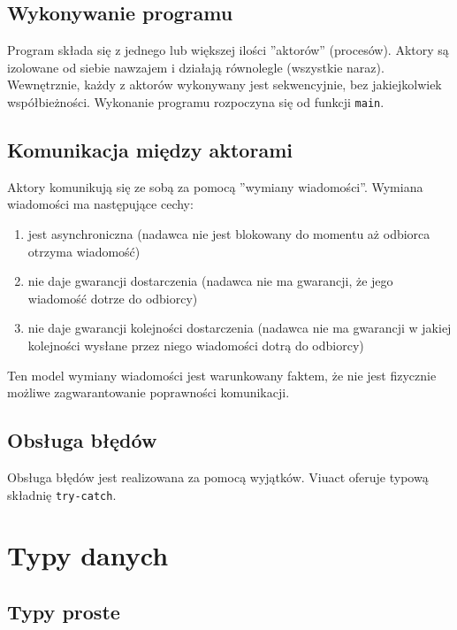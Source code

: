 \subsection{Wykonywanie programu}

Program składa się z jednego lub większej ilości ''aktorów'' (procesów).
Aktory są izolowane od siebie nawzajem i działają równolegle (wszystkie naraz).
Wewnętrznie, każdy z aktorów wykonywany jest sekwencyjnie, bez jakiejkolwiek
współbieżności.
Wykonanie programu rozpoczyna się od funkcji \texttt{main}.

\subsection{Komunikacja między aktorami}

Aktory komunikują się ze sobą za pomocą ''wymiany wiadomości''.
Wymiana wiadomości ma następujące cechy:

\begin{enumerate}
    \item jest asynchroniczna (nadawca nie jest blokowany do momentu aż odbiorca otrzyma
        wiadomość)
    \item nie daje gwarancji dostarczenia (nadawca nie ma gwarancji, że jego wiadomość
        dotrze do odbiorcy)
    \item nie daje gwarancji kolejności dostarczenia (nadawca nie ma gwarancji w jakiej
        kolejności wysłane przez niego wiadomości dotrą do odbiorcy)
\end{enumerate}

Ten model wymiany wiadomości jest warunkowany faktem, że nie jest fizycznie
możliwe zagwarantowanie poprawności komunikacji.

\subsection{Obsługa błędów}

Obsługa błędów jest realizowana za pomocą wyjątków. Viuact oferuje typową
składnię \texttt{try-catch}.

\newpage

\section{Typy danych}

\subsection{Typy proste}

